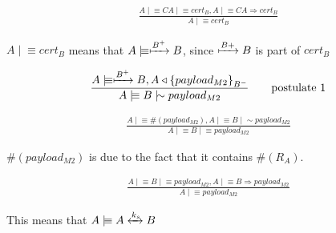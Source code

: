 \documentclass[a4paper,12pt]{article}
\newcommand{\believes}{\mid\!\equiv}
\newcommand{\sees}{\triangleleft}
\newcommand{\oncesaid}{\mid\!\sim}
\newcommand{\controls}{\Rightarrow}
\newcommand{\fresh}[1]{\#(#1)}
\newcommand{\encrypt}[2]{{ \{ #1 \} }_{#2}}
\newcommand{\sharekey}[1]{\xleftrightarrow{#1}}
\newcommand{\pubkey}[1]{\xmapsto{#1}}
\begin{document}
\begin{align}
\frac{A \believes CA \believes cert_B, A \believes CA \controls cert_B}{A \believes cert_B} \tag*{postulate 3}
\end{align}

$A \believes cert_B$ means that $A \believes \pubkey{B^+} B$, since $\pubkey{B+} B$ is part of $cert_B$

\begin{align}
\frac{A \believes \pubkey{B^+} B, A \sees \encrypt{payload_{M2}}{B^-}}{A \believes B \oncesaid payload_{M2}} \tag*{postulate 1}
\end{align}

\begin{align}
\frac{A \believes \fresh{payload_{M2}}, A \believes B \oncesaid payload_{M2}}{A \believes B \believes payload_{M2}} \tag*{postulate 2}
\end{align}

$\fresh{payload_{M2}}$ is due to the fact that it contains $\fresh{R_A}$.

\begin{align}
\frac{A \believes B \believes payload_{M2}, A \believes B \controls payload_{M2}}{A \believes payload_{M2}} \tag*{postulate 3}
\end{align}

This means that $A \believes A \sharekey{k_s} B$
\end{document}
